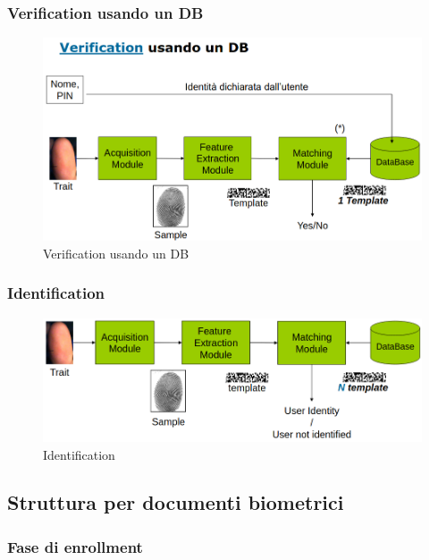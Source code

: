\newpage

\subsubsection{Verification usando un DB}

\begin{figure}[ht]
    \centering
    \includegraphics[width=0.95\linewidth]{chapters/images-chap2/verification-gen.png}
    \caption{Verification usando un DB}
    \label{fig:verification-gen}
\end{figure}

\newpage
\subsubsection{Identification}

\begin{figure}[ht]
    \centering
    \includegraphics[width=0.95\linewidth]{chapters/images-chap2/identification-gen.png}
    \caption{Identification}
    \label{fig:id-gen}
\end{figure}

\subsection{Struttura per documenti biometrici}

\subsubsection{Fase di enrollment}

